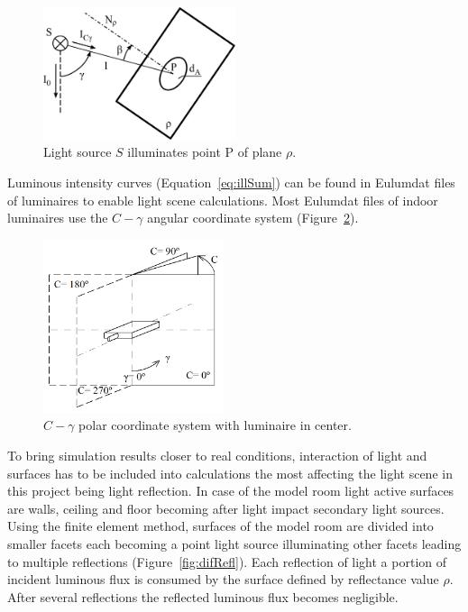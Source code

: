 \begin{figure}[htb]
  \centering
  \includegraphics[width=160pt]{315_osvetlenost_bodovym_zdrojem_2}
  \caption{Light source $S$ illuminates point P of plane $\rho$.}
  \label{fig:osv}
\end{figure}

Luminous intensity curves (Equation~\ref{eq:illSum}) can be found in Eulumdat files of luminaires to enable light scene calculations. Most Eulumdat files of indoor luminaires use the $C-\gamma$ angular coordinate system (Figure~\ref{fig:cgamma}).

\begin{figure}[htb]
  \centering
  \includegraphics[width=150pt]{Cgama}
  \caption{$C-\gamma$ polar coordinate system with luminaire in center.}
  \label{fig:cgamma}
\end{figure}

To bring simulation results closer to real conditions, interaction of light and surfaces has to be included into calculations the most affecting the light scene in this project being light reflection. In case of the model room light active surfaces are walls, ceiling and floor becoming after light impact secondary light sources. Using the finite element method, surfaces of the model room are divided into smaller facets each becoming a point light source illuminating other facets leading to multiple reflections (Figure~\ref{fig:difRefl}). Each reflection of light a portion of incident luminous flux is consumed by the surface defined by reflectance value $\rho$. After several reflections the reflected luminous flux becomes negligible.

